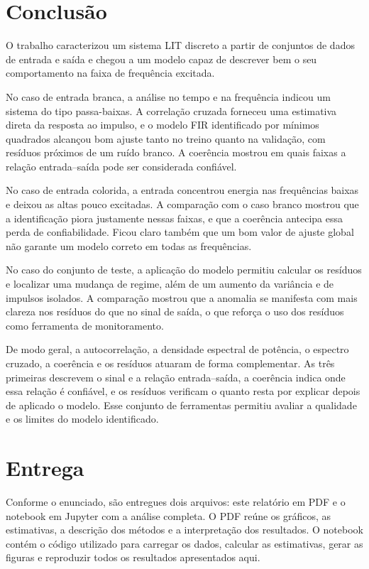 \section{Conclusão}

O trabalho caracterizou um sistema LIT discreto a partir de conjuntos de dados de
entrada e saída e chegou a um modelo capaz de descrever bem o seu comportamento na
faixa de frequência excitada.

No caso de entrada branca, a análise no tempo e na frequência indicou um sistema do
tipo passa-baixas. A correlação cruzada forneceu uma estimativa direta da resposta ao
impulso, e o modelo FIR identificado por mínimos quadrados alcançou bom ajuste tanto
no treino quanto na validação, com resíduos próximos de um ruído branco. A coerência
mostrou em quais faixas a relação entrada--saída pode ser considerada confiável.

No caso de entrada colorida, a entrada concentrou energia nas frequências baixas e
deixou as altas pouco excitadas. A comparação com o caso branco mostrou que a
identificação piora justamente nessas faixas, e que a coerência antecipa essa perda de
confiabilidade. Ficou claro também que um bom valor de ajuste global não garante um
modelo correto em todas as frequências.

No caso do conjunto de teste, a aplicação do modelo permitiu calcular os resíduos e
localizar uma mudança de regime, além de um aumento da variância e de impulsos
isolados. A comparação mostrou que a anomalia se manifesta com mais clareza nos
resíduos do que no sinal de saída, o que reforça o uso dos resíduos como ferramenta de
monitoramento.

De modo geral, a autocorrelação, a densidade espectral de potência, o espectro
cruzado, a coerência e os resíduos atuaram de forma complementar. As três primeiras
descrevem o sinal e a relação entrada--saída, a coerência indica onde essa relação é
confiável, e os resíduos verificam o quanto resta por explicar depois de aplicado o
modelo. Esse conjunto de ferramentas permitiu avaliar a qualidade e os limites do
modelo identificado.

\section*{Entrega}

Conforme o enunciado, são entregues dois arquivos: este relatório em PDF e o
notebook em Jupyter com a análise completa. O PDF reúne os gráficos, as estimativas, a
descrição dos métodos e a interpretação dos resultados. O notebook contém o código
utilizado para carregar os dados, calcular as estimativas, gerar as figuras e
reproduzir todos os resultados apresentados aqui.
